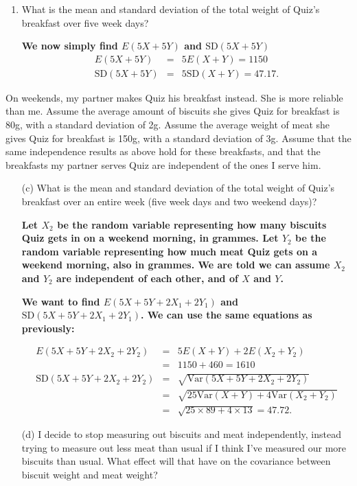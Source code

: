\documentclass[11pt,a4paper]{article}
\begin{document}
\begin{enumerate}
\begin{enumerate}
\item What is the mean and standard deviation of the total weight of Quiz's breakfast over five week days?

\textbf{We now simply find $E(5X+5Y)$ and $\textrm{SD}(5X+5Y)$}
\textbf{
\begin{eqnarray*}
E(5X+5Y)&=&5E(X+Y)=1150\\
\textrm{SD}(5X+5Y)&=&5\textrm{SD}(X+Y)=47.17.
\end{eqnarray*}
}
\end{enumerate}
On weekends, my partner makes Quiz his breakfast instead. She is more reliable than me. Assume the average amount of biscuits she gives Quiz for breakfast is 80g, with a standard deviation of 2g. Assume the average weight of meat she gives Quiz for breakfast is 150g, with a standard deviation of 3g. Assume that the same independence results as above hold for these breakfasts, and that the breakfasts my partner serves Quiz are independent of the ones I serve him.

\begin{enumerate}
\item[(c)] What is the mean and standard deviation of the total weight of Quiz's breakfast over an entire week (five week days and two weekend days)?

\textbf{Let $X_2$ be the random variable representing how many biscuits Quiz gets in on a weekend morning, in grammes. Let $Y_2$ be the random variable representing how much meat Quiz gets on a weekend morning, also in grammes. We are told we can assume $X_2$ and $Y_2$ are independent of each other, and of $X$ and $Y$.}

\textbf{We want to find $E(5X+5Y+2X_1+2Y_1)$ and $\textrm{SD}(5X+5Y+2X_1+2Y_1)$. We can use the same equations as previously:}

\textbf{
\begin{eqnarray*}
E(5X+5Y+2X_2+2Y_2)&=&5E(X+Y)+2E(X_2+Y_2)\\ &=&1150+460=1610\\
\textrm{SD}(5X+5Y+2X_2+2Y_2)&=&\sqrt{\textrm{Var}(5X+5Y+2X_2+2Y_2)}\\
&=&\sqrt{25\textrm{Var}(X+Y)   + 4\textrm{Var}(X_2+Y_2)}\\
&=&\sqrt{25\times89+4\times13}=47.72.
\end{eqnarray*}
}

\item[(d)] I decide to stop measuring out biscuits and meat independently, instead trying to measure out less meat than usual if I think I've measured our more biscuits than usual. What effect will that have on the covariance between biscuit weight and meat weight?


\end{enumerate}
\end{enumerate}
\end{document}
